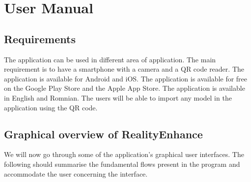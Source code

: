 \chapter{User Manual}\label{cap:evaluation}

\section{Requirements}
The application can be used in different area of application. The main requirement is to have a smartphone with a camera and a \ac{QR} code reader. The application is available for Android and iOS. The application is available for free on the Google Play Store and the Apple App Store. The application is available in English and Romnian. The users will be able to import any model in the application using the \ac{QR} code.

\section{Graphical overview of RealityEnhance}
We will now go through some of the application's graphical user interfaces. The following should summarise the fundamental flows present in the program and accommodate the user concerning the interface.
\pagebreak

